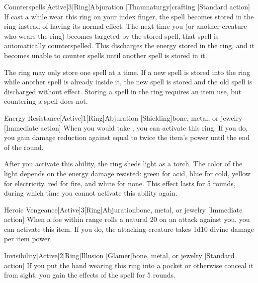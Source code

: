         \begin{magicitemdef}{Counterspells}[Active]{3}[Ring]{Abjuration [Thaumaturgy]}{crafting}
            [Standard action] If cast a  while wear this ring on your index finger, the spell becomes stored in the ring instead of having its normal effect.
            The next time you (or another creature who wears the ring) becomes targeted by the stored spell, that spell is automatically counterspelled.
            This discharges the energy stored in the ring, and it becomes unable to counter spells until another spell is stored in it.

            The ring may only store one spell at a time.
            If a new spell is stored into the ring while another spell is already inside it, the new spell is stored and the old spell is discharged without effect.
            Storing a spell in the ring requires an item use, but countering a spell does not.
        \end{magicitemdef}

        \begin{magicitemdef}{Energy Resistance}[Active]{1}[Ring]{Abjuration [Shielding]}{bone, metal, or jewelry}
            [Immediate action] When you would take , you can activate this ring.
            If you do, you gain damage reduction against  equal to twice the item's power until the end of the round.

            After you activate this ability, the ring sheds light as a torch.
            The color of the light depends on the energy damage resisted: green for acid, blue for cold, yellow for electricity, red for fire, and white for none.
            This effect lasts for 5 rounds, during which time you cannot activate this ability again.
        \end{magicitemdef}

        \begin{magicitemdef}{Heroic Vengeance}[Active]{3}[Ring]{Abjuration}{bone, metal, or jewelry}
            [Immediate action] When a foe within \rngmed range rolls a natural 20 on an attack against you, you can activate this item.
            If you do, the attacking creature takes 1d10 divine damage per item power.
        \end{magicitemdef}

        \begin{magicitemdef}{Invisibility}[Active]{2}[Ring]{Illusion [Glamer]}{bone, metal, or jewelry}
            [Standard action] If you put the hand wearing this ring into a pocket or otherwise conceal it from sight, you gain the effects of the  spell for 5 rounds.
        \end{magicitemdef}

